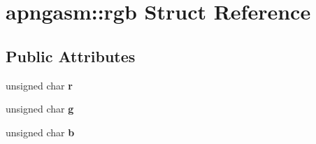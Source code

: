 \hypertarget{structapngasm_1_1rgb}{\section{apngasm\-:\-:rgb Struct Reference}
\label{structapngasm_1_1rgb}
}
\subsection*{Public Attributes}
\begin{DoxyCompactItemize}
\item 
\hypertarget{structapngasm_1_1rgb_af60990d3c0364c292f5b703cfb46acd0}{unsigned char {\bfseries r}}\label{structapngasm_1_1rgb_af60990d3c0364c292f5b703cfb46acd0}

\item 
\hypertarget{structapngasm_1_1rgb_a35445cb046cda51b506d09fb2886d589}{unsigned char {\bfseries g}}\label{structapngasm_1_1rgb_a35445cb046cda51b506d09fb2886d589}

\item 
\hypertarget{structapngasm_1_1rgb_a269d607598e5f3cbd37cc6ee6cd66730}{unsigned char {\bfseries b}}\label{structapngasm_1_1rgb_a269d607598e5f3cbd37cc6ee6cd66730}

\end{DoxyCompactItemize}
